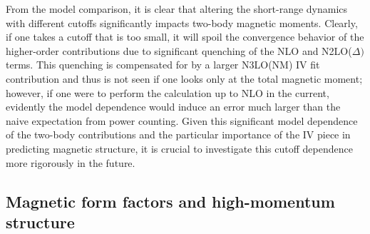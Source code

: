 \documentclass[aps,prc,floatfix,showpacs,twocolumn, preprintnumbers]{revtex4-2}
\begin{document}
From the model comparison, it is clear that altering the short-range dynamics with different cutoffs significantly impacts two-body magnetic moments. Clearly, if one takes a cutoff that is too small, it will spoil the convergence behavior of the higher-order contributions due to significant quenching of the NLO and N2LO($\Delta)$ terms. This quenching is compensated for by a larger N3LO(NM) IV fit contribution and thus is not seen if one looks only at the total magnetic moment; however, if one were to perform the calculation up to NLO in the current, evidently the model dependence would induce an error much larger than the naive expectation from power counting. Given this significant model dependence of the two-body contributions and the particular importance of the IV piece in predicting magnetic structure, it is crucial to investigate this cutoff dependence more rigorously in the future. 

\subsection{Magnetic form factors and high-momentum structure}
\label{sec:ff}
\end{document}

